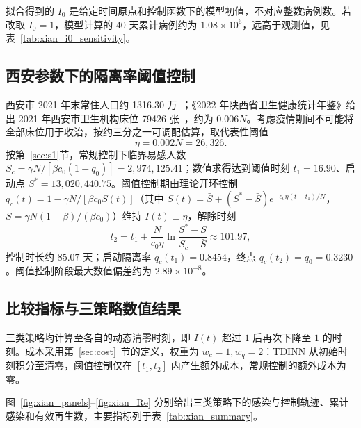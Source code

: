 \documentclass[UTF8,a4paper,10pt,fontset=fandol]{ctexart}
\theoremstyle{cnplain}
\theoremstyle{remark}
\numberwithin{equation}{section}
\begin{document}
拟合得到的 $I_0$ 是给定时间原点和控制函数下的模型初值，不对应整数病例数。若改取 $I_0=1$，模型计算的 $40$ 天累计病例约为 $1.08\times10^6$，远高于观测值，见表~\ref{tab:xian_i0_sensitivity}。

\begin{table}[htbp]
    \centering
    \caption{固定参数后的初始条件估计。}
    \label{tab:xian_initial_fit}
    
\end{table}

\begin{table}[htbp]
    \centering
    \caption{不同初值设定下的模型输出。}
    \label{tab:xian_i0_sensitivity}
    {}
\end{table}

\subsection{西安参数下的隔离率阈值控制}
西安市 2021 年末常住人口约 1316.30 万~\cite{XianStat2021}；《2022 年陕西省卫生健康统计年鉴》给出 2021 年西安市卫生机构床位 79426 张~\cite{ShaanxiHealth2022}，约为 $0.006N$。考虑疫情期间不可能将全部床位用于收治，按约三分之一可调配估算，取代表性阈值
\begin{equation}
\eta=0.002N=26{,}326.
\end{equation}
按第~\ref{sec:s1}节，常规控制下临界易感人数 $S_c=\gamma N/[\beta c_0(1-q_0)]=2{,}974{,}125.41$；数值求得达到阈值时刻 $t_1=16.90$、启动点 $S^*=13{,}020{,}440.75$。阈值控制期由理论开环控制 $q_c(t)=1-\gamma N/[\beta c_0 S(t)]$（其中 $S(t)=\bar S+(S^*-\bar S)e^{-c_0\eta(t-t_1)/N}$，$\bar S=\gamma N(1-\beta)/(\beta c_0)$）维持 $I(t)\equiv\eta$，解除时刻
\[
t_2=t_1+\frac{N}{c_0\eta}\ln\frac{S^*-\bar S}{S_c-\bar S}\approx101.97,
\]
控制时长约 $85.07$ 天；启动隔离率 $q_c(t_1)=0.8454$，终点 $q_c(t_2)=q_0=0.3230$。阈值控制阶段最大数值偏差约为 $2.89\times10^{-8}$。

\subsection{比较指标与三策略数值结果}
三类策略均计算至各自的动态清零时刻，即 $I(t)$ 超过 $1$ 后再次下降至 $1$ 的时刻。成本采用第~\ref{sec:cost}~节的定义，权重为 $w_c=1,w_q=2$：TDINN 从初始时刻积分至清零，阈值控制仅在 $[t_1,t_2]$ 内产生额外成本，常规控制的额外成本为零。

图~\ref{fig:xian_panels}--\ref{fig:xian_Re} 分别给出三类策略下的感染与控制轨迹、累计感染和有效再生数，主要指标列于表~\ref{tab:xian_summary}。
\end{document}
